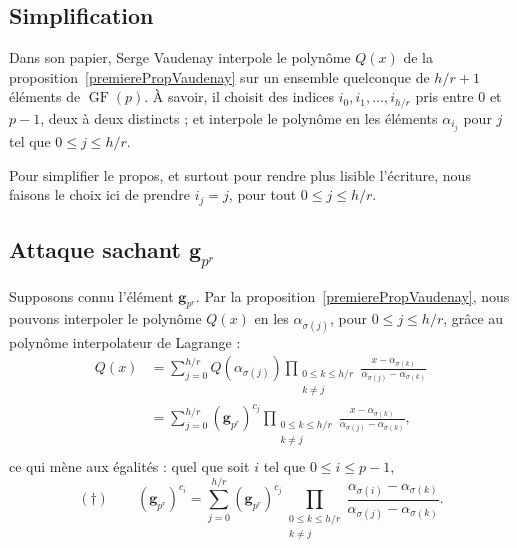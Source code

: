 \documentclass[a4paper, titlepage, 11pt]{article}
\theoremstyle{definition}
\theoremstyle{remark}
\def\gf{\operatorname{GF}}
\def\mbf#1{\mathbf{#1}}
\begin{document}
\subsection*{Simplification}

Dans son papier, Serge Vaudenay interpole le polynôme $Q(x)$ de la proposition~\ref{premierePropVaudenay} sur un ensemble quelconque de $h/r+1$ éléments de $\gf(p)$. À savoir, il choisit des indices $i_0, i_1, \dots, i_{h/r}$ pris entre $0$ et $p-1$, deux à deux distincts ; et interpole le polynôme en les éléments $\alpha_{i_j}$ pour $j$ tel que $0 \leqslant j \leqslant h/r$. 

Pour simplifier le propos, et surtout pour rendre plus lisible l'écriture, nous faisons le choix ici de prendre $i_j = j$, pour tout $0 \leqslant j \leqslant h/r$.

\subsection*{Attaque sachant $\mbf g_{p^r}$}

Supposons connu l'élément $\mbf g_{p^r}$. Par la proposition~\ref{premierePropVaudenay}, nous pouvons interpoler le polynôme $Q(x)$ en les $\alpha_{\sigma(j)}$, pour $0 \leqslant j \leqslant h/r$, grâce au polynôme interpolateur de Lagrange :
\begin{align*}
Q(x) &= \sum_{j=0}^{h/r} Q\left(\alpha_{\sigma(j)}\right) \prod_{\substack{0\leqslant k\leqslant h/r \\ k \neq j}}\frac{x-\alpha_{\sigma(k)}}{\alpha_{\sigma(j)}-\alpha_{\sigma(k)}} \\
&= \sum_{j=0}^{h/r} (\mbf g_{p^r})^{c_{j}} \prod_{\substack{0\leqslant k\leqslant h/r \\ k \neq j}}\frac{x-\alpha_{\sigma(k)}}{\alpha_{\sigma(j)}-\alpha_{\sigma(k)}}, \\
\end{align*} 
ce qui mène aux égalités : quel que soit $i$ tel que $0\leqslant i \leqslant p-1$,
$$(\dagger) \qquad (\mbf g_{p^r})^{c_i} = \sum_{j=0}^{h/r} (\mbf g_{p^r})^{c_{j}}\prod_{\substack{0\leqslant k\leqslant h/r \\ k \neq j}} \frac{\alpha_{\sigma(i)}-\alpha_{\sigma(k)}}{\alpha_{\sigma(j)}-\alpha_{\sigma(k)}}.$$
\end{document}
